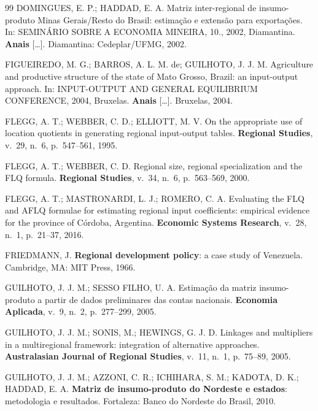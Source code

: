 \documentclass[11pt,a4paper]{article}
\begin{document}
\begin{thebibliography}{99}
DOMINGUES, E. P.; HADDAD, E. A. Matriz inter-regional de insumo-produto Minas
Gerais/Resto do Brasil: estimação e extensão para exportações. In: SEMINÁRIO SOBRE
A ECONOMIA MINEIRA, 10., 2002, Diamantina. \textbf{Anais} [\ldots]. Diamantina:
Cedeplar/UFMG, 2002.

FIGUEIREDO, M. G.; BARROS, A. L. M. de; GUILHOTO, J. J. M. Agriculture and
productive structure of the state of Mato Grosso, Brazil: an input-output approach.
In: INPUT-OUTPUT AND GENERAL EQUILIBRIUM CONFERENCE, 2004, Bruxelas.
\textbf{Anais} [\ldots]. Bruxelas, 2004.

FLEGG, A. T.; WEBBER, C. D.; ELLIOTT, M. V. On the appropriate use of location
quotients in generating regional input-output tables. \textbf{Regional Studies},
v.~29, n.~6, p.~547--561, 1995.

FLEGG, A. T.; WEBBER, C. D. Regional size, regional specialization and the FLQ
formula. \textbf{Regional Studies}, v.~34, n.~6, p.~563--569, 2000.

FLEGG, A. T.; MASTRONARDI, L. J.; ROMERO, C. A. Evaluating the FLQ and AFLQ
formulae for estimating regional input coefficients: empirical evidence for the
province of Córdoba, Argentina. \textbf{Economic Systems Research}, v.~28, n.~1,
p.~21--37, 2016.

FRIEDMANN, J. \textbf{Regional development policy}: a case study of Venezuela.
Cambridge, MA: MIT Press, 1966.

GUILHOTO, J. J. M.; SESSO FILHO, U. A. Estimação da matriz insumo-produto a partir
de dados preliminares das contas nacionais. \textbf{Economia Aplicada}, v.~9,
n.~2, p.~277--299, 2005.

GUILHOTO, J. J. M.; SONIS, M.; HEWINGS, G. J. D. Linkages and multipliers in a
multiregional framework: integration of alternative approaches.
\textbf{Australasian Journal of Regional Studies}, v.~11, n.~1, p.~75--89, 2005.

GUILHOTO, J. J. M.; AZZONI, C. R.; ICHIHARA, S. M.; KADOTA, D. K.; HADDAD, E. A.
\textbf{Matriz de insumo-produto do Nordeste e estados}: metodologia e resultados.
Fortaleza: Banco do Nordeste do Brasil, 2010.


\end{thebibliography}
\end{document}
